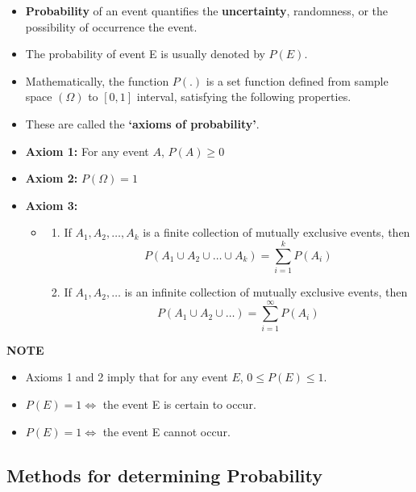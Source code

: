 \documentclass[]{book}
\providecommand{\tightlist}{%
  \setlength{\itemsep}{0pt}\setlength{\parskip}{0pt}}
\begin{document}
\begin{itemize}
\item
  \textbf{Probability} of an event quantifies the \textbf{uncertainty}, randomness, or the possibility of occurrence the event.
\item
  The probability of event E is usually denoted by \(P(E)\).
\item
  Mathematically, the function \(P(.)\) is a set function defined from sample space \((\Omega)\) to \([0, 1]\) interval, satisfying the following properties.
\item
  These are called the \textbf{`axioms of probability'}.
\item
  \textbf{Axiom 1:} For any event \(A\), \(P(A) \geq 0\)
\item
  \textbf{Axiom 2:} \(P(\Omega) = 1\)
\item
  \textbf{Axiom 3:}

  \begin{itemize}
  \item
    \begin{enumerate}
    \def\labelenumi{(\alph{enumi})}
    \tightlist
    \item
      If \(A_1, A_2, \dots, A_k\) is a finite collection of mutually exclusive events, then \[P(A_1\cup A_2\cup \dots \cup A_k)= \sum_{i=1}^kP(A_i)\]
    \item
      If \(A_1, A_2, \dots\) is an infinite collection of mutually exclusive events, then
      \[P(A_1\cup A_2\cup \dots)= \sum_{i=1}^\infty P(A_i)\]
    \end{enumerate}
  \end{itemize}
\end{itemize}

\textbf{NOTE}

\begin{itemize}
\tightlist
\item
  Axioms 1 and 2 imply that for any event \(E\), \(0 \leq P (E) \leq 1\).
\item
  \(P (E) = 1 \iff\) the event E is certain to occur.
\item
  \(P (E) = 1 \iff\) the event E cannot occur.
\end{itemize}

\hypertarget{methods-for-determining-probability}{%
\subsection*{Methods for determining Probability}\label{methods-for-determining-probability}}
\end{document}
